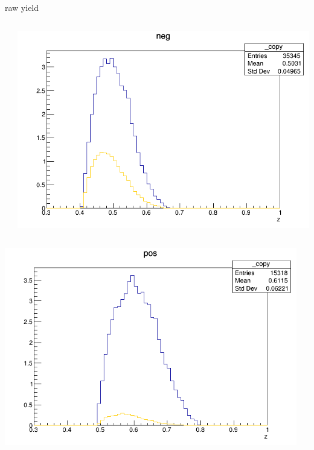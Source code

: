 \begin{frame}{raw yield}
\begin{columns}
\begin{column}[T]{0.25\textwidth}
\end{column}
\begin{column}[T]{0.25\textwidth}
\includegraphics[width = \textwidth]{results/yield/statistics/yield_x_Q2_z_0.65_5.500_0.50_neg.png}
\end{column}
\end{columns}
\begin{columns}
\begin{column}[T]{0.25\textwidth}
\includegraphics[width = \textwidth]{results/yield/statistics/yield_x_Q2_z_0.65_5.500_0.60_pos.png}
\end{column}
\begin{column}[T]{0.25\textwidth}

\end{column}
\end{columns}
\end{frame}
